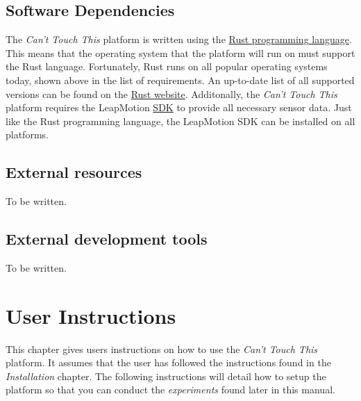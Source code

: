 \documentclass[a4paper]{article}
\begin{document}
  \subsection{Software Dependencies}
  The \textit{Can't Touch This} platform is written using the
  \href{https://rust-lang.org}{Rust programming language}. This means that the
  operating system that the platform will run on must support the Rust language.
  Fortunately, Rust runs on all popular operating systems today, shown above in
  the list of requirements. An up-to-date list of all supported versions can be
  found on the
  \href{https://forge.rust-lang.org/platform-support.html}{Rust website}.
  Additonally, the \textit{Can't Touch This} platform requires the LeapMotion
  \href{https://developer.leapmotion.com/sdk/v2}{SDK} to provide all necessary
  sensor data. Just like the Rust programming language, the LeapMotion SDK can
  be installed on all platforms.

  \subsection{External resources}
  To be written.

  \subsection{External development tools}
  To be written.
  \clearpage


  \section{User Instructions}
  This chapter gives users instructions on how to use the \textit{Can't Touch
    This} platform. It assumes that the user has followed the instructions found
  in the \textit{Installation} chapter. The following instructions will detail
  how to setup the platform so that you can conduct the \textit{experiments}
  found later in this manual.
  \clearpage
\end{document}
